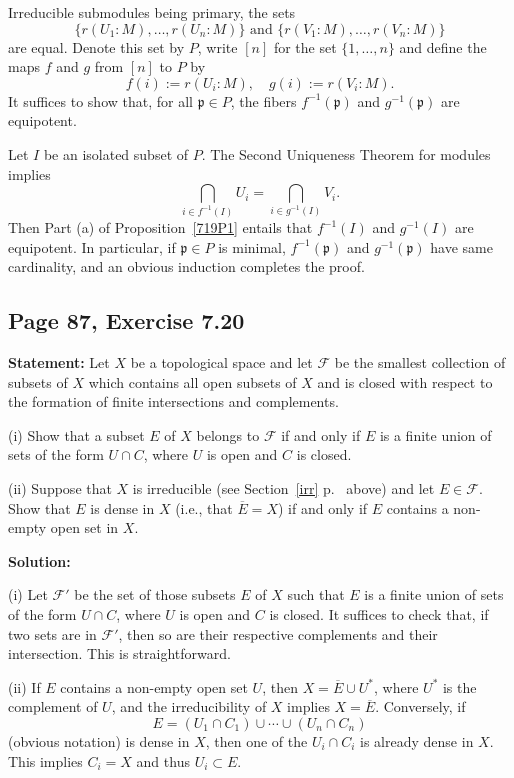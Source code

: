 \documentclass[parskip=half,fontsize=12pt]{scrartcl}%
\newcommand{\mf}{\mathfrak}
\newcommand{\ppp}{\mf p}
\begin{document}
Irreducible submodules being primary, the sets 
$$
\{r(U_1:M),\dots,r(U_n:M)\}\text{ and }\{r(V_1:M),\dots,r(V_n:M)\}
$$ 
are equal. Denote this set by $P$, write $[n]$ for the set $\{1,\dots,n\}$ and define the maps $f$ and $g$ from $[n]$ to $P$ by 
$$
f(i):=r(U_i:M),\quad g(i):=r(V_i:M).
$$ 
It suffices to show that, for all $\ppp\in P$, the fibers $f^{-1}(\ppp)$ and $g^{-1}(\ppp)$ are equipotent. 

Let $I$ be an isolated subset of $P$. The Second Uniqueness Theorem for modules implies 
$$
\bigcap_{i\in f^{-1}(I)}U_i=\bigcap_{i\in g^{-1}(I)}V_i.
$$ 
Then Part (a) of Proposition~\ref{719P1} entails that $f^{-1}(I)$ and $g^{-1}(I)$ are equipotent. In particular, if $\ppp\in P$ is minimal, $f^{-1}(\ppp)$ and $g^{-1}(\ppp)$ have same cardinality, and an obvious induction completes the proof. 

\subsection{Page 87, Exercise 7.20}\label{720}%

\textbf{Statement:} Let $X$ be a topological space and let $\mathcal F$ be the smallest collection of subsets of $X$ which contains all open subsets of $X$ and is closed with respect to the formation of finite intersections and complements.

(i) Show that a subset $E$ of $X$ belongs to $\mathcal F$ if and only if $E$ is a finite union of sets of the form $U\cap C$, where $U$ is open and $C$ is closed.

(ii) Suppose that $X$ is irreducible (see Section~\ref{irr} p.~\pageref{irr} above) and let $E\in\mathcal F$. Show that $E$ is dense in $X$ (i.e., that $\overline E=X$) if and only if $E$ contains a non-empty open set in $X$. 

\textbf{Solution:}

(i) Let $\mathcal F'$ be the set of those subsets $E$ of $X$ such that $E$ is a finite union of sets of the form $U\cap C$, where $U$ is open and $C$ is closed. It suffices to check that, if two sets are in $\mathcal F'$, then so are their respective complements and their intersection. This is straightforward. 

(ii) If $E$ contains a non-empty open set $U$, then $X=\overline E\cup U^*$, where $U^*$ is the complement of $U$, and the irreducibility of $X$ implies $X=\overline E$. Conversely, if 
$$
E=(U_1\cap C_1)\cup\cdots\cup(U_n\cap C_n)
$$ 
(obvious notation) is dense in $X$, then one of the $U_i\cap C_i$ is already dense in $X$. This implies $C_i=X$ and thus $U_i\subset E$.
\end{document}
